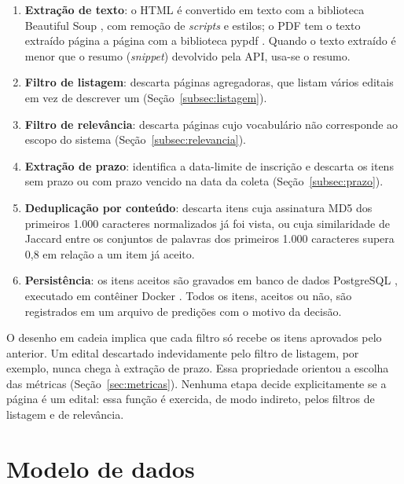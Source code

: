 \begin{enumerate}
  \item \textbf{Extração de texto}: o HTML é convertido em texto com a
    biblioteca Beautiful Soup \cite{beautifulsoup}, com remoção de
    \textit{scripts} e estilos; o PDF tem o texto extraído página a página com a
    biblioteca pypdf \cite{pypdf}. Quando o texto extraído é menor que o resumo
    (\textit{snippet}) devolvido pela API, usa-se o resumo.
  \item \textbf{Filtro de listagem}: descarta páginas agregadoras, que listam
    vários editais em vez de descrever um (Seção~\ref{subsec:listagem}).
  \item \textbf{Filtro de relevância}: descarta páginas cujo vocabulário não
    corresponde ao escopo do sistema (Seção~\ref{subsec:relevancia}).
  \item \textbf{Extração de prazo}: identifica a data-limite de inscrição e
    descarta os itens sem prazo ou com prazo vencido na data da coleta
    (Seção~\ref{subsec:prazo}).
  \item \textbf{Deduplicação por conteúdo}: descarta itens cuja assinatura MD5
    \cite{rivest1992} dos primeiros 1.000 caracteres normalizados já foi vista,
    ou cuja similaridade de Jaccard \cite{jaccard1901,broder1997} entre os
    conjuntos de palavras dos primeiros 1.000 caracteres supera 0,8 em relação
    a um item já aceito.
  \item \textbf{Persistência}: os itens aceitos são gravados em banco de dados
    PostgreSQL \cite{postgresql}, executado em contêiner Docker \cite{docker}.
    Todos os itens, aceitos ou não, são registrados em um arquivo de predições
    com o motivo da decisão.
\end{enumerate}

O desenho em cadeia implica que cada filtro só recebe os itens aprovados pelo
anterior. Um edital descartado indevidamente pelo filtro de listagem, por
exemplo, nunca chega à extração de prazo. Essa propriedade orientou a escolha
das métricas (Seção~\ref{sec:metricas}). Nenhuma etapa decide explicitamente se
a página é um edital: essa função é exercida, de modo indireto, pelos filtros
de listagem e de relevância.

\section{Modelo de dados}
\label{sec:modelo_dados}

